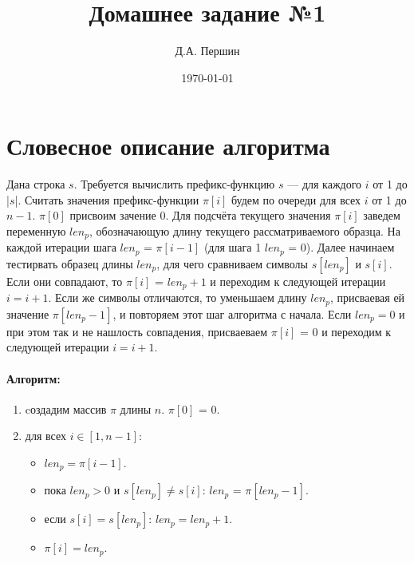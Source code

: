 \documentclass[12pt]{article}
\title{\bf Домашнее задание №1}
\author{Д.А. Першин}
\date{\today}
\begin{document}
\maketitle


\section{Словесное описание алгоритма}
Дана строка $s$. Требуется вычислить префикс-функцию $s$ — для каждого $i$ от 1 до |$s$|.
Считать значения префикс-функции $\pi[i]$ будем по очереди для всех $i$ от 1 до $n-1$. $\pi[0]$ присвоим зачение 0.
Для подсчёта текущего значения $\pi[i]$ заведем переменную $len_p$, обозначающую длину текущего рассматриваемого образца. На каждой итерации шага $len_p$ = $\pi[i-1]$ (для шага 1 $len_p$ = 0). Далее начинаем тестирвать образец длины $len_p$, для чего сравниваем символы $s[len_p]$ и $s[i]$. Если они совпадают, то $\pi[i]$ = $len_p+1$ и переходим к следующей итерации $i = i+1$. Если же символы отличаются, то уменьшаем длину $len_p$, присваевая ей значение $\pi[len_p-1]$, и повторяем этот шаг алгоритма с начала. Если $len_p=0$ и при этом так и не нашлость совпадения, присваеваем $\pi[i]$ = 0 и переходим к следующей итерации $i = i + 1$.






\paragraph{Алгоритм:}

\begin{enumerate}

\item cоздадим массив $\pi$ длины $n$. $\pi[0]$ = 0.

\item для всех $i \in [1, n-1]$:

	\begin{itemize} 
	
	\item $len_p = \pi[i-1]$.

	\item пока $len_p > 0$ и $s[len_p] \neq s[i]$: $len_p$ = $\pi[len_p-1]$.	
	
	\item если $s[i] = s[len_p]$: $len_p  = len_p + 1$.

	\item $\pi[i] = len_p$.
	
	\end{itemize}
	
\end{enumerate}
	
\end{document}
